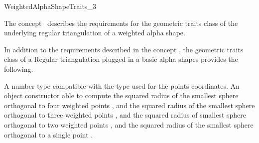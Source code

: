 

\begin{ccRefConcept}{WeightedAlphaShapeTraits_3}


\ccDefinition
  
The concept \ccRefName\ describes the requirements 
for the geometric traits class
of  the underlying  regular triangulation of a weighted alpha shape.

\ccRefines
{}

In addition to the requirements described in the concept 
,
the geometric traits class of a
Regular triangulation plugged in a basic alpha shapes
provides the following.

\ccTypes


 {A number type compatible with the type used for
  the points coordinates.}
{An object constructor able to compute the squared radius of the
 smallest sphere  orthogonal to  four weighted points ,
and the squared radius of the
smallest sphere  orthogonal to  three  weighted points ,
and the squared radius of smallest  sphere orthogonal to 
two weighted points ,
and the  squared radius  of the smallest sphere orthogonal to a single
point .} 

\ccCreation
{}  %


\ccAccessFunctions
{} {}


\ccHasModels


\end{ccRefConcept}


